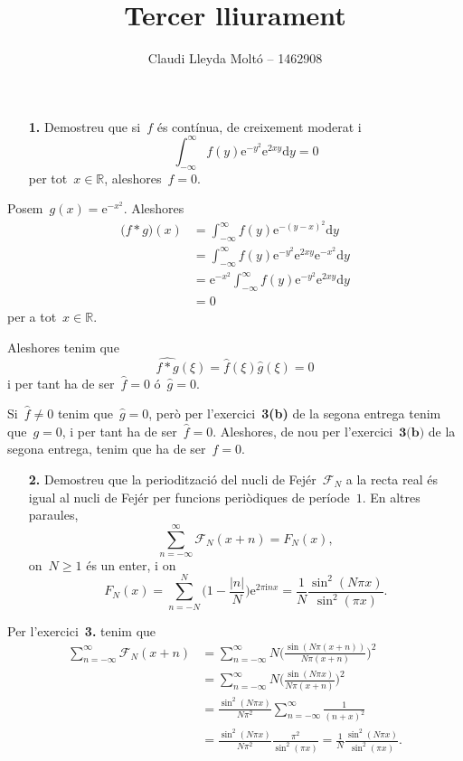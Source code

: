\documentclass[a4paper]{article}
\title{Tercer lliurament}
\author{Claudi Lleyda Moltó -- 1462908}
\theoremstyle{plain}
\newcommand{\iu}{\mathrm{i}}
\newcommand{\e}{\mathrm{e}}
\providecommand{\uppi}{\pi}
\newcommand{\diff}{\mathrm{d}}
\newcommand{\abs}[1]{\lvert{#1}\rvert}
\newcommand{\F}{\mathcal{F}}
\begin{document}
\maketitle

\begin{enumerate}
    \item[\textbf{1.}] Demostreu que si~\(f\) és contínua, de creixement moderat
        i
        \[
            \int_{-\infty}^{\infty}f(y)\e^{-y^{2}}\e^{2xy}\diff y=0
        \]
        per tot~\(x\in\mathbb{R}\), aleshores~\(f=0\).
\end{enumerate}

Posem~\(g(x) = \e^{-x^{2}}\). Aleshores
\begin{align*}
    \bigl(f\ast g\bigr)(x)
        &= \int_{-\infty}^{\infty} f(y)\e^{-(y-x)^{2}} \diff y \\
        &= \int_{-\infty}^{\infty} f(y)\e^{-y^{2}}\e^{2xy}\e^{-x^{2}} \diff y \\
        &= \e^{-x^{2}}\int_{-\infty}^{\infty} f(y)\e^{-y^{2}}\e^{2xy} \diff y \\
        &= 0
\end{align*}
per a tot~\(x\in\mathbb{R}\).

Aleshores tenim que
\[
    \widehat{f\ast g}(\xi) = \widehat{f}(\xi)\widehat{g}(\xi) = 0
\]
i per tant ha de ser~\(\widehat{f} = 0\) \'o~\(\widehat{g} = 0\).

Si~\(\widehat{f}\neq0\) tenim que~\(\widehat{g} = 0\), però per
l'exercici~\textbf{3(b)} de la segona entrega tenim que~\(g=0\), i per tant ha
de ser~\(\widehat{f}=0\). Aleshores, de nou per l'exercici~\(\textbf{3(b)}\) de
la segona entrega, tenim que ha de ser~\(f=0\).

\begin{enumerate}
    \item[\textbf{2.}] Demostreu que la periodització del nucli de
        Fejér~\(\F_{N}\) a la recta real és igual al nucli de Fejér per funcions
        periòdiques de període~\(1\).
        En altres paraules,
        \[
            \sum_{n=-\infty}^{\infty} \F_{N}(x+n)
            = F_{N}(x),
        \]
        on~\(N\geq1\) és un enter, i on
        \[
            F_{N}(x) = \sum_{n=-N}^{N} \biggl(1 - \frac{\abs{n}}{N}\biggr)
            \e^{2\uppi\iu nx}
            = \frac{1}{N}\frac{\sin^{2}(N\uppi x)}{\sin^{2}(\uppi x)}.
        \]
\end{enumerate}

Per l'exercici~\textbf{3.} tenim que
\begin{align*}
    \sum_{n=-\infty}^{\infty} \F_{N}(x+n)
        &=
        \sum_{n=-\infty}^{\infty}
        N\biggl(\frac{\sin(N\uppi (x+n))}{N\uppi (x+n)}\biggr)^{2} \\
        &=
        \sum_{n=-\infty}^{\infty}
        N\biggl(\frac{\sin(N\uppi x)}{N\uppi (x+n)}\biggr)^{2} \\
        &=
        \frac{\sin^{2}(N\uppi x)}{N\uppi^{2}}
        \sum_{n=-\infty}^{\infty}
        \frac{1}{(n+x)^{2}} \\
        &=
        \frac{\sin^{2}(N\uppi x)}{N\uppi^{2}}
        \frac{\uppi^{2}}{\sin^{2}(\uppi x)}
        = \frac{1}{N}\frac{\sin^{2}(N\uppi x)}{\sin^{2}(\uppi x)}.
\end{align*}
\end{document}
